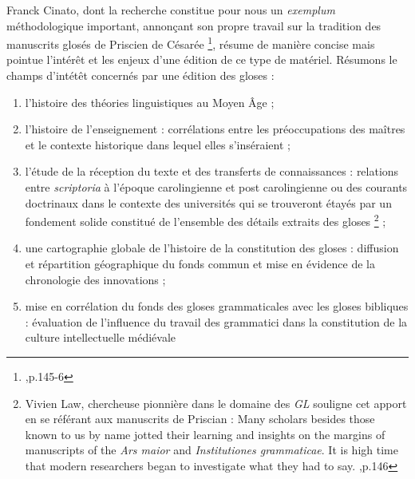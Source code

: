 \documentclass[a4paper, twoside, 12pt]{book}
\begin{document}
Franck Cinato, dont la recherche constitue pour nous un \textit{exemplum} méthodologique important, annonçant son propre travail sur la tradition des manuscrits glosés de Priscien de Césarée \footnote{\cite{cinato2011perspectives},p.145-6}, résume de manière concise mais pointue  l'intérêt et les enjeux d'une édition de ce type de matériel. Résumons le champs d'intétêt concernés par une édition des gloses :
\begin{enumerate}
    \item l'histoire des théories linguistiques au Moyen Âge ;
    \item l'histoire de l’enseignement : corrélations entre les préoccupations des maîtres et le contexte historique dans lequel elles s’inséraient ;
    \item l'étude de la réception du texte et des transferts de connaissances : relations entre \textit{scriptoria} à l’époque carolingienne et post carolingienne ou des courants doctrinaux dans le contexte des universités qui se trouveront étayés par un fondement solide constitué de l’ensemble des détails extraits des gloses \footnote{Vivien Law, chercheuse pionnière dans le domaine des \textit{GL} souligne cet apport en se référant aux manuscrits de Priscian : \og{} Many scholars besides those known to us by name jotted their learning and insights on the margins of manuscripts of the \textit{Ars maior} and \textit{Institutiones grammaticae}. It is high time that modern researchers began to investigate what they had to say. \fg{} \cite{law1997grammar},p.146} ;
    \item une cartographie globale de l’histoire de la constitution des
    gloses : diffusion et répartition géographique du fonds commun et mise en
    évidence de la chronologie des innovations ;
    \item mise en corrélation du fonds des gloses grammaticales avec les gloses bibliques : évaluation de l’influence du travail des grammatici dans la constitution de la culture intellectuelle médiévale\\
\end{enumerate}
\end{document}
